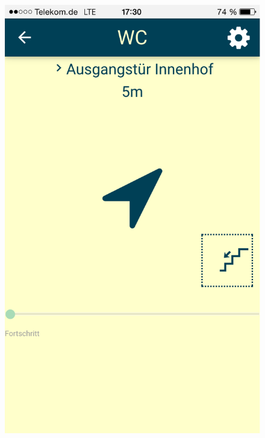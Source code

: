 \begin{figure}[ht]
\begin{flushleft}
\begin{minipage}[b]{.5\textwidth}
  \includegraphics[width=.8\linewidth]{img/navigation2.png}
  \label{img:navigation-second-draft}
\end{minipage}
\end{flushleft}
\end{figure}

